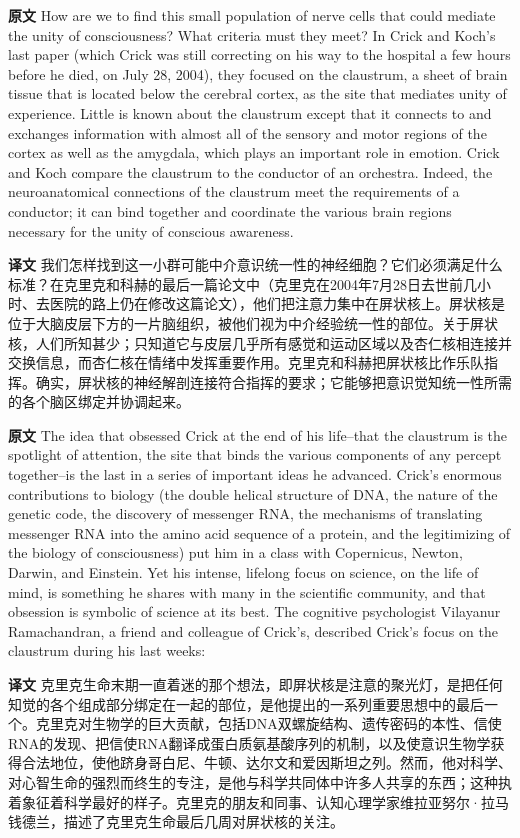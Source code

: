 \documentclass[UTF8,zihao=-4]{ctexart}
\newcommand{\BodyFont}{\fontsize{10.5pt}{15.5pt}\selectfont}
\newcommand{\origlabel}{\textbf{原文}\quad}
\newcommand{\translabel}{\textbf{译文}\quad}
\newenvironment{enblock}{\par\noindent\begingroup\BodyFont\origlabel}{\par\endgroup}
\newenvironment{zhblock}{\par\noindent\begingroup\BodyFont\translabel}{\par\endgroup\vspace{0.35em}}
\begin{document}
\begin{enblock}
How are we to find this small population of nerve cells that could mediate the unity of consciousness? What criteria must they meet? In Crick and Koch's last paper (which Crick was still correcting on his way to the hospital a few hours before he died, on July 28, 2004), they focused on the claustrum, a sheet of brain tissue that is located below the cerebral cortex, as the site that mediates unity of experience. Little is known about the claustrum except that it connects to and exchanges information with almost all of the sensory and motor regions of the cortex as well as the amygdala, which plays an important role in emotion. Crick and Koch compare the claustrum to the conductor of an orchestra. Indeed, the neuroanatomical connections of the claustrum meet the requirements of a conductor; it can bind together and coordinate the various brain regions necessary for the unity of conscious awareness.
\end{enblock}
\begin{zhblock}
我们怎样找到这一小群可能中介意识统一性的神经细胞？它们必须满足什么标准？在克里克和科赫的最后一篇论文中（克里克在2004年7月28日去世前几小时、去医院的路上仍在修改这篇论文），他们把注意力集中在屏状核上。屏状核是位于大脑皮层下方的一片脑组织，被他们视为中介经验统一性的部位。关于屏状核，人们所知甚少；只知道它与皮层几乎所有感觉和运动区域以及杏仁核相连接并交换信息，而杏仁核在情绪中发挥重要作用。克里克和科赫把屏状核比作乐队指挥。确实，屏状核的神经解剖连接符合指挥的要求；它能够把意识觉知统一性所需的各个脑区绑定并协调起来。\end{zhblock}

\begin{enblock}
The idea that obsessed Crick at the end of his life--that the claustrum is the spotlight of attention, the site that binds the various components of any percept together--is the last in a series of important ideas he advanced. Crick's enormous contributions to biology (the double helical structure of DNA, the nature of the genetic code, the discovery of messenger RNA, the mechanisms of translating messenger RNA into the amino acid sequence of a protein, and the legitimizing of the biology of consciousness) put him in a class with Copernicus, Newton, Darwin, and Einstein. Yet his intense, lifelong focus on science, on the life of mind, is something he shares with many in the scientific community, and that obsession is symbolic of science at its best. The cognitive psychologist Vilayanur Ramachandran, a friend and colleague of Crick's, described Crick's focus on the claustrum during his last weeks:
\end{enblock}
\begin{zhblock}
克里克生命末期一直着迷的那个想法，即屏状核是注意的聚光灯，是把任何知觉的各个组成部分绑定在一起的部位，是他提出的一系列重要思想中的最后一个。克里克对生物学的巨大贡献，包括DNA双螺旋结构、遗传密码的本性、信使RNA的发现、把信使RNA翻译成蛋白质氨基酸序列的机制，以及使意识生物学获得合法地位，使他跻身哥白尼、牛顿、达尔文和爱因斯坦之列。然而，他对科学、对心智生命的强烈而终生的专注，是他与科学共同体中许多人共享的东西；这种执着象征着科学最好的样子。克里克的朋友和同事、认知心理学家维拉亚努尔·拉马钱德兰，描述了克里克生命最后几周对屏状核的关注。\end{zhblock}
\end{document}
